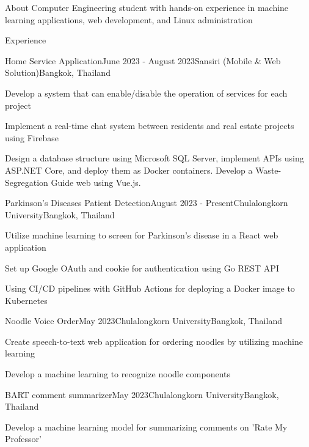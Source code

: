 \documentclass[12pt]{resume}
\begin{document}
\begin{rSection}{About}
    Computer Engineering student with hands-on experience in machine learning applications, web development, and Linux administration
\end{rSection}

\begin{rSection}{Experience}

    \begin{rSubsection}{Home Service Application}{June 2023 - August 2023}{Sansiri (Mobile \& Web Solution)}{Bangkok, Thailand}
        \item Develop a system that can enable/disable the operation of services for each project
        \item Implement a real-time chat system between residents and real estate projects using Firebase
        \item Design a database structure using Microsoft SQL Server, implement APIs using ASP.NET Core, and deploy them as Docker containers. Develop a Waste-Segregation Guide web using Vue.js.
    \end{rSubsection}

	\begin{rSubsection}{Parkinson's Diseases Patient Detection}{August 2023 - Present}{Chulalongkorn University}{Bangkok, Thailand}
        \item Utilize machine learning to screen for Parkinson's disease in a React web application
        \item Set up Google OAuth and cookie for authentication using Go REST API
        \item Using CI/CD pipelines with GitHub Actions for deploying a Docker image to Kubernetes
	\end{rSubsection}

	\begin{rSubsection}{Noodle Voice Order}{May 2023}{Chulalongkorn University}{Bangkok, Thailand}
        \item Create speech-to-text web application for ordering noodles by utilizing machine learning
        \item Develop a machine learning to recognize noodle components
	\end{rSubsection}

    \begin{rSubsection}{BART comment summarizer}{May 2023}{Chulalongkorn University}{Bangkok, Thailand}
        \item Develop a machine learning model for summarizing comments on 'Rate My Professor'
    \end{rSubsection}

\end{rSection}
\end{document}
